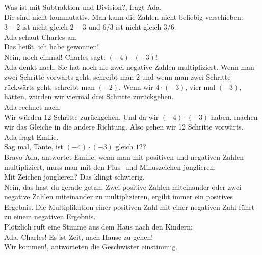 \frqq{}Was ist mit Subtraktion und Division?\flqq{}, fragt Ada.\\
\frqq{}Die sind nicht kommutativ. Man kann die Zahlen nicht beliebig verschieben: $3 - 2$ ist nicht gleich $2 - 3$ und $6/3$ ist nicht gleich $3/6$.\flqq{}\\
Ada schaut Charles an.\\
\frqq{}Das heißt, ich habe gewonnen!\flqq{}\\
\frqq{}Nein, noch einmal! Charles sagt: $(-4) \cdot (-3)$!\flqq{}\\
Ada denkt nach. Sie hat noch nie zwei negative Zahlen multipliziert.
\frqq{} Wenn man zwei Schritte vorwärts geht, schreibt man $2$ und wenn man zwei Schritte rückwärts geht, schreibt man $(-2)$. Wenn wir $4 \cdot (-3)$, vier mal $(-3)$, hätten, würden wir viermal drei Schritte zurückgehen.\flqq{}\\
Ada rechnet nach.\\
\frqq{}Wir würden 12 Schritte zurückgehen. Und da wir $ (-4) \cdot (-3)$ haben, machen wir das Gleiche in die andere Richtung. Also gehen wir 12 Schritte vorwärts.\flqq{}\\
Ada fragt Emilie.\\
\frqq{}Sag mal, Tante, ist $(-4) \cdot (-3)$ gleich $12$?\\
\frqq{}Bravo Ada\flqq{}, antwortet Emilie, \frqq{}wenn man mit positiven und negativen Zahlen multipliziert, muss man mit den Plus- und Minuszeichen jonglieren.\flqq{}\\
\frqq{}Mit Zeichen jonglieren? Das klingt schwierig.\flqq{}\\
\frqq{}Nein, das hast du gerade getan. Zwei positive Zahlen miteinander oder zwei negative Zahlen miteinander zu multiplizieren, ergibt immer ein positives Ergebnis. Die Multiplikation einer positiven Zahl mit einer negativen Zahl führt zu einem negativen Ergebnis.\flqq{}\\
Plötzlich ruft eine Stimme aus dem Haus nach den Kindern:\\
\frqq{}Ada, Charles! Es ist Zeit, nach Hause zu gehen!\flqq{}\\
\frqq{}Wir kommen!\flqq{}, antworteten die Geschwister einstimmig.